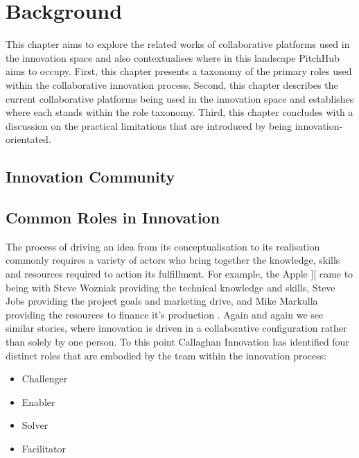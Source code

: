 \chapter{Background}

This chapter aims to explore the related works of collaborative platforms used in the innovation space and also contextualises where in this landscape PitchHub aims to occupy. First, this chapter presents a taxonomy of the primary roles used within the collaborative innovation process. Second, this chapter describes the current collaborative platforms being used in the innovation space and establishes where each stands within the role taxonomy. Third, this chapter concludes with a discussion on the practical limitations that are introduced by being innovation-orientated.

\section{Innovation Community}


\section{Common Roles in Innovation}

The process of driving an idea from its conceptualisation to its realisation commonly requires a variety of actors who bring together the knowledge, skills and resources required to action its fulfillment. For example, the Apple ][ came to being with Steve Wozniak providing the technical knowledge and skills, Steve Jobs providing the project goals and marketing drive, and Mike Markulla providing the resources to finance it's production \cite{livingston2007founders}. Again and again we see similar stories, where innovation is driven in a collaborative configuration rather than solely by one person. To this point Callaghan Innovation has identified four distinct roles that are embodied by the team within the innovation process:

\begin{itemize}
	\item Challenger
	\item Enabler
	\item Solver
	\item Facilitator
\end{itemize}

